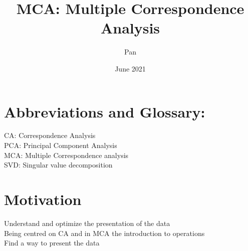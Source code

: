 \documentclass[12pt]{extarticle}
\title{MCA: Multiple Correspondence Analysis}
\author{Pan }
\date{June 2021}
\numberwithin{equation}{section}
\begin{document}
\maketitle
\section{Abbreviations and Glossary:}
CA: Correspondence Analysis \\
PCA: Principal Component Analysis \\
MCA: Multiple Correspondence analysis \\
SVD: Singular value decomposition \\

\section{Motivation}
Understand and optimize the presentation of the data\\
Being centred on CA and in MCA the introduction to operations\\ 
Find a way to present the data 
\end{document}
